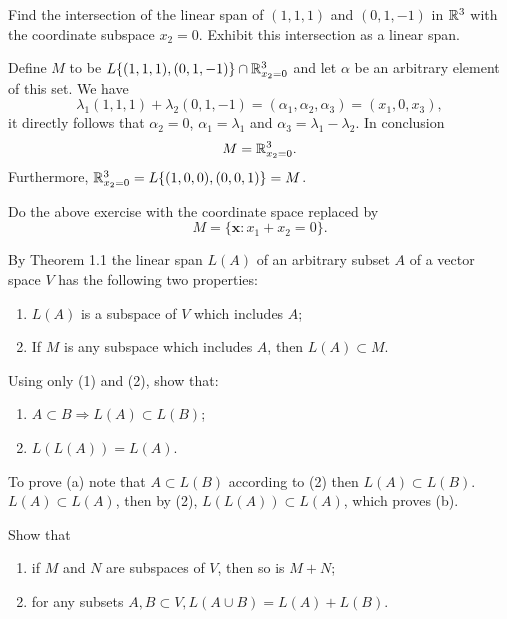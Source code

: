 \documentclass[../../main.tex]{subfiles}
\begin{document}
\begin{problem}
	Find the intersection of the linear span of $(1,1,1)$ and $(0,1,-1)$ in $\mathbb{R}^3$ with the coordinate subspace $x_2 = 0$. Exhibit this intersection as a linear span.
\end{problem}
\begin{solution}
	Define $M$ to be $L\{(1,1,1),(0,1,-1) \} \cap \mathbb{R}^3_{x_2 = 0}$ and let $\alpha$ be an arbitrary element of this set. We have 
	\[
		\lambda_1(1,1,1) + \lambda_2(0,1,-1) = (\alpha_1, \alpha_2, \alpha_3) = (x_1, 0, x_3),
	\]
	it directly follows that $\alpha_2 = 0$, $\alpha_1 = \lambda_1$ and $\alpha_3 = \lambda_1 - \lambda_2$. In conclusion
	\[
		M = \mathbb{R}^3_{x_2 = 0}.
	\]
	Furthermore, $\mathbb{R}^3_{x_2 = 0} = L\{(1,0,0), (0,0,1)\} = M$.	
\end{solution}
\begin{problem}
Do the above exercise with the coordinate space replaced by
\[
	M = \{ \mathbf{x} : x_1 + x_2 = 0 \}.
\]

\end{problem}
\begin{problem}
	By Theorem 1.1 the linear span $L(A)$ of an arbitrary subset $A$ of a vector space $V$ has the following two properties:
	\begin{enumerate}
		\item $L(A)$ is a subspace of $V$ which includes $A$;
		\item If $M$ is any subspace which includes $A$, then $L(A) \subset M$.
	\end{enumerate}
	Using only (1) and (2), show that:
	\begin{enumerate}[label = (\alph*)]
		\item $A \subset B \Rightarrow L(A) \subset L(B)$;
		\item $L(L(A)) = L(A)$.
	\end{enumerate}
\end{problem}
\begin{solution}
	To prove (a) note that $A \subset L(B)$ according to (2) then $L(A) \subset L(B)$. 
	$L(A) \subset L(A)$, then by (2), $L(L(A)) \subset L(A)$, which proves (b).
\end{solution}
\begin{problem}
	Show that
	\begin{enumerate}[label = (\alph*)]
		\item if $M$ and $N$ are subspaces of $V$, then so is $M+N$;
		\item for any subsets $A,B \subset V, L(A \cup B) = L(A) + L(B)$.
	\end{enumerate}
\end{problem}
\end{document}

